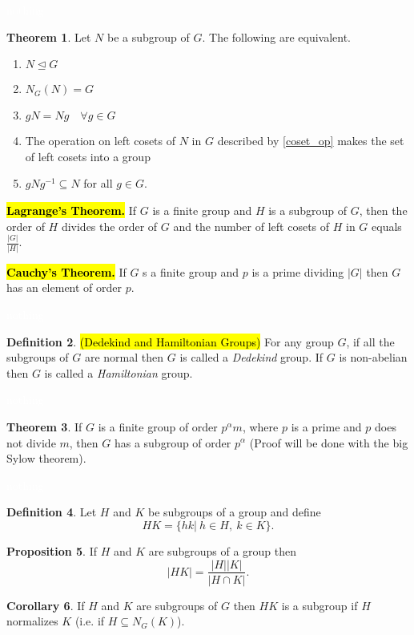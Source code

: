 \documentclass{article}
\theoremstyle{definition}
\newtheorem{thm}{Theorem}[section]
\newtheorem{prop}[thm]{Proposition}
\newtheorem{cor}[thm]{Corollary}
\newtheorem{defn}[thm]{Definition}
\newcommand{\nl}{\textcolor{white}{nothing}}
\newcommand{\seq}{\subseteq}
\newcommand{\al}{\alpha}
\begin{document}
\nl

\begin{thm}
Let $N$ be a subgroup of $G$. The following are equivalent.
\begin{enumerate}
\item $N\unlhd G$
\item $N_G(N) = G$
\item $gN = Ng \quad \forall g\in G$
\item The operation on left cosets of $N$ in $G$ described by \autoref{coset_op} makes the set of left cosets into a group
\item $gNg^{-1} \seq N$ for all $g\in G$.
\end{enumerate}
\end{thm}

\hl{\textbf{Lagrange's Theorem.}} If $G$ is a finite group and $H$ is a subgroup of $G$, then the order of $H$ divides the order of $G$ and the number of left cosets of $H$ in $G$ equals $\frac{|G|}{|H|}$.

\hl{\textbf{Cauchy's Theorem.}} If $G$ s a finite group and $p$ is a prime dividing $|G|$ then $G$ has an element of order $p$.

\nl

\begin{defn}\hl{(Dedekind and Hamiltonian Groups)}
For any group $G$, if all the subgroups of $G$ are normal then $G$ is called a \textit{Dedekind} group. If $G$ is non-abelian then $G$ is called a \textit{Hamiltonian} group.
\end{defn}

\nl
\begin{thm}
If $G$ is a finite group of order $p^\al m$, where $p$ is a prime and $p$ does not divide $m$, then $G$ has a subgroup of order $p^\al$ (Proof will be done with the big Sylow theorem).
\end{thm}

\nl
\begin{defn}
Let $H$ and $K$ be subgroups of a group and define
\[HK = \{hk |\ h\in H,\ k\in K\}.\]
\end{defn}

\begin{prop}
If $H$ and $K$ are subgroups of a group then
\[|HK| = \frac{|H||K|}{|H\cap K|}.\]
\end{prop}

\begin{cor}
If $H$ and $K$ are subgroups of $G$ then $HK$ is a subgroup if $H$ normalizes $K$ (i.e. if $H\seq N_G(K)$).
\end{cor}
\end{document}
